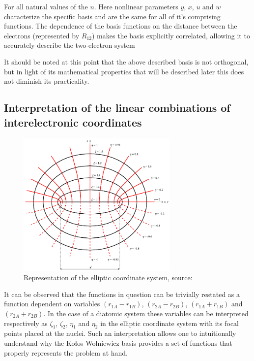 \documentclass{pracalicmgr}
\begin{document}
For all natural values of the $n$. Here nonlinear parameters $y$, $x$, $u$ and $w$ characterize the specific basis and are the same for all of it's comprising functions.
The dependence of the basis functions on the distance between the electrons (represented by $R_{12}$) makes the basis explicitly correlated, allowing it to accurately describe the two-electron system 

It should be noted at this point that the above described basis is not orthogonal, but in light of its  mathematical properties that will be described later this does not diminish its practicality.

\subsection{Interpretation of the linear combinations of interelectronic coordinates}

\begin{figure}[H]
    \center
    \includegraphics[width=0.70\textwidth]{oblate.pdf}
    \caption{Representation of the elliptic coordinate system, source: \cite{EllipticRys} }
    \label{eliptical}
\end{figure}

It can be observed that the functions in question can be trivially restated as a function dependent on variables $\left(r_{1A}-r_{1B}\right)$, $\left(r_{2A}-r_{2B}\right)$, $\left(r_{1A}+r_{1B}\right)$ and $\left(r_{2A}+r_{2B}\right)$. In the case of a diatomic system these variables can be interpreted respectively as $\zeta_1$, $\zeta_2$, $\eta_1$ and $\eta_2$ in the elliptic coordinate system\cite{eliptic_article} with its focal points placed at the nuclei. Such an interpretation allows one to intuitionally understand why the Kołos-Wolniewicz basis provides a set of functions that properly represents the problem at hand.
\end{document}

